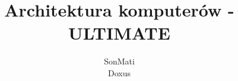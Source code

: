 \documentclass[a4paper,twoside]{article}
\begin{document}





\begin{titlepage}
\title{\huge Architektura komputerów - ULTIMATE}
\author{\large SonMati \\ Doxus}
\maketitle
\end{titlepage}








	
\end{document}
